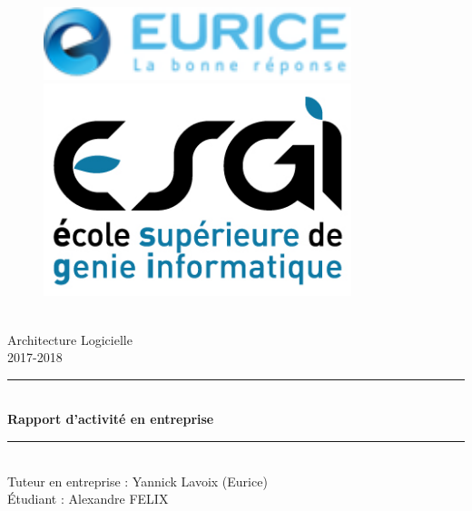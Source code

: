 \documentclass[11pt]{report}
\begin{document}
    \begin{titlepage}
    \begin{center}
    
    \begin{figure}
        \centering
        \begin{minipage}{0.33\textwidth}
            \includegraphics[width=0.8\textwidth]{Images/eurice} %
        \end{minipage}
        \begin{minipage}{0.33\textwidth}
            \centering
            \includegraphics[width=0.8\textwidth]{Images/esgi} %
        \end{minipage}
    \end{figure}
    ~\\[3\baselineskip]
    {\large Architecture Logicielle}\\[0.7cm]
    {\large 2017-2018}\\[0.7cm]
    
    \rule{\linewidth}{0.5mm} \\[0.4cm]
    { \huge \bfseries Rapport d'activité en entreprise\\[0.4cm] }
    \rule{\linewidth}{0.5mm} \\[1.5cm]
    
    {\large Tuteur en entreprise : Yannick Lavoix (Eurice)}\\[0.3cm]
    {\large Étudiant : Alexandre FELIX}\\[0.3cm]
    
    \vfill
    \end{center}
    \end{titlepage}
    \clearpage
    
\end{document}
